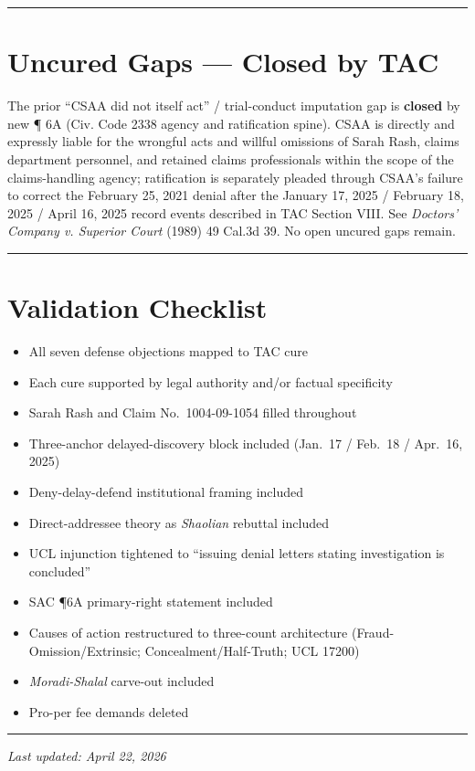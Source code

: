 \begin{center}\rule{0.5\linewidth}{0.5pt}\end{center}

\section{Uncured Gaps --- Closed by TAC}\label{uncured-gaps-closed-by-tac}

The prior ``CSAA did not itself act'' / trial-conduct imputation gap is \textbf{closed} by new ¶ 6A (Civ. Code \textsection{} 2338 agency and ratification spine). CSAA is directly and expressly liable for the wrongful acts and willful omissions of Sarah Rash, claims department personnel, and retained claims professionals within the scope of the claims-handling agency; ratification is separately pleaded through CSAA's failure to correct the February 25, 2021 denial after the January 17, 2025 / February 18, 2025 / April 16, 2025 record events described in TAC Section VIII. See \emph{Doctors' Company v. Superior Court} (1989) 49 Cal.3d 39. No open uncured gaps remain.

\begin{center}\rule{0.5\linewidth}{0.5pt}\end{center}

\section{Validation Checklist}\label{validation-checklist}

\begin{itemize}
\tightlist
\item[$\boxtimes$]
  All seven defense objections mapped to TAC cure
\item[$\boxtimes$]
  Each cure supported by legal authority and/or factual specificity
\item[$\boxtimes$]
  Sarah Rash and Claim No.~1004-09-1054 filled throughout
\item[$\boxtimes$]
  Three-anchor delayed-discovery block included (Jan.~17 / Feb.~18 / Apr.~16, 2025)
\item[$\boxtimes$]
  Deny-delay-defend institutional framing included
\item[$\boxtimes$]
  Direct-addressee theory as \emph{Shaolian} rebuttal included
\item[$\boxtimes$]
  UCL injunction tightened to ``issuing denial letters stating investigation is concluded''
\item[$\boxtimes$]
  SAC ¶6A primary-right statement included
\item[$\boxtimes$]
  Causes of action restructured to three-count architecture (Fraud-Omission/Extrinsic; Concealment/Half-Truth; UCL \textsection{} 17200)
\item[$\boxtimes$]
  \emph{Moradi-Shalal} carve-out included
\item[$\boxtimes$]
  Pro-per fee demands deleted
\end{itemize}

\begin{center}\rule{0.5\linewidth}{0.5pt}\end{center}

\emph{Last updated: April 22, 2026}

\nolinenumbers




